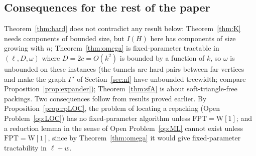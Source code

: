 \subsection{Consequences for the rest of the paper}
Theorem~\ref{thm:hard} does not contradict any result below: Theorem~\ref{thm:K} needs components of bounded size, but $I(H)$ here has components of size growing with $n$; Theorem~\ref{thm:omega} is fixed-parameter tractable in $(\ell,D,\omega)$ where $D=2c=O(k^2)$ is bounded by a function of $k$, so $\omega$ is unbounded on these instances (the tunnels are hard pairs between far vertices and make the graph $\Gamma'$ of Section~\ref{sec:nl} have unbounded treewidth; compare Proposition~\ref{prop:expander}); Theorem~\ref{thm:sfA} is about soft-triangle-free packings. Two consequences follow from results proved earlier. By Proposition~\ref{prop:rpLOC}, the problem of locating a repacking (Open Problem~\ref{op:LOC}) has no fixed-parameter algorithm unless $\mathrm{FPT}=\mathrm{W[1]}$; and a reduction lemma in the sense of Open Problem~\ref{op:ML} cannot exist unless $\mathrm{FPT}=\mathrm{W[1]}$, since by Theorem~\ref{thm:omega} it would give fixed-parameter tractability in $\ell+w$.
